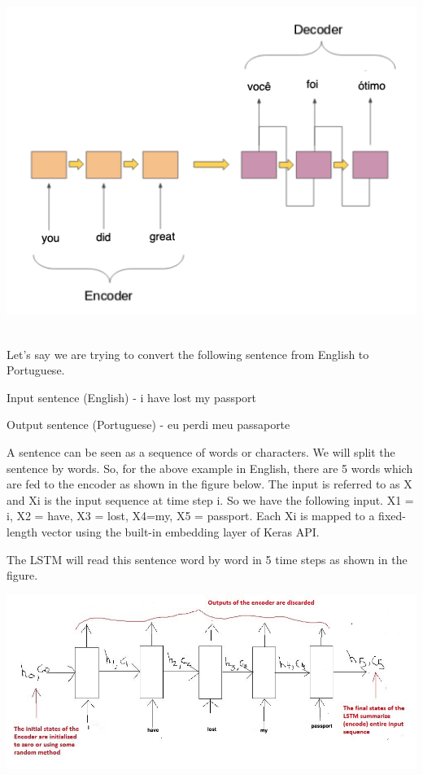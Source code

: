 \documentclass[runningheads]{llncs}
\begin{document}
	\begin{minipage}{\linewidth}
		\begin{center}
			\includegraphics[width=\linewidth]{enc_dec_2.png}
			\label{fig:Sequence to Sequence Model}~\cite{ref_url4}
		\end{center}
	\end{minipage}
	\afterpage{\clearpage}
	
	Let's say we are trying to convert the following sentence from English to Portuguese.

	Input sentence (English) - i have lost my passport
	
	Output sentence (Portuguese) - eu perdi meu passaporte
	
	A sentence can be seen as a sequence of words or characters. We will split the sentence by words. So, for the above example in English, there are 5 words which are fed to the encoder as shown in the figure below. The input is referred to as X and X{i} is the input sequence at time step i. So we have the following input.
	X{1} = i, X{2} = have, X{3} = lost,  X{4}=my, X{5} = passport.
	Each X{i} is mapped to a fixed-length vector using the built-in embedding layer of Keras API.
	
	The LSTM will read this sentence word by word in 5 time steps as shown in the figure.
	
	\begin{minipage}{\linewidth}
		\begin{center}
			\includegraphics[width=\linewidth]{EncoderLSTM.jpeg}
			\label{fig:Encoder LSTM}~\cite{ref_url5}
		\end{center}
	\end{minipage}
	\afterpage{\clearpage}
	
\end{document}
